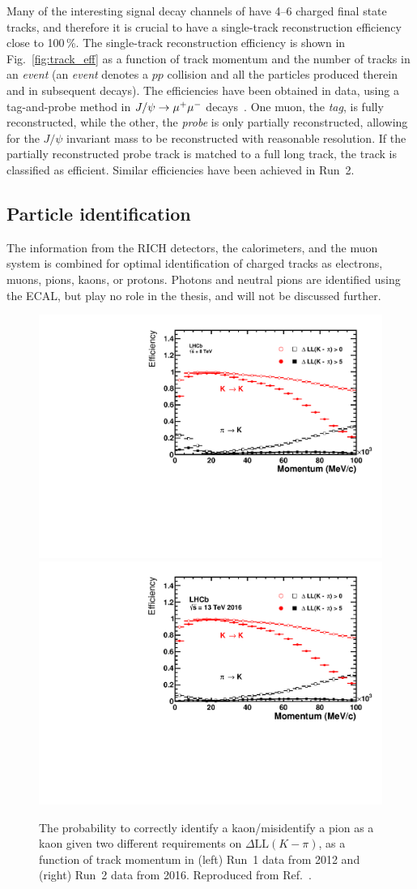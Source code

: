 Many of the interesting signal decay channels of \lhcb have 4--6 charged final state tracks, and therefore it is crucial to have a single-track reconstruction efficiency close to 100\,\%. The single-track reconstruction efficiency is shown in Fig.~\ref{fig:track_eff} as a function of track momentum and the number of tracks in an \emph{event} (an \emph{event} denotes a $pp$ collision and all the particles produced therein and in subsequent decays). The efficiencies have been obtained in data, using a tag-and-probe method in $J/\psi\rightarrow{\ensuremath{\mu^+}}\mu^-$ decays~\cite{TrackEff}. One muon, the \emph{tag}, is fully reconstructed, while the other, the \emph{probe} is only partially reconstructed, allowing for the $J/\psi$ invariant mass to be reconstructed with reasonable resolution. If the partially reconstructed probe track is matched to a full long track, the track is classified as efficient.
Similar efficiencies have been achieved in Run~2.




\subsection{Particle identification} %
\label{sub:particle_identification}
The information from the RICH detectors, the calorimeters, and the muon system is combined for optimal identification of charged tracks as electrons, muons, pions, kaons, or protons. Photons and neutral pions are identified using the ECAL, but play no role in the thesis, and will not be discussed further.

\begin{figure}[tb]
    \centering
    \includegraphics[width=0.45\columnwidth]{figures/detector/PIDK_Run1.pdf}
    \includegraphics[width=0.45\columnwidth]{figures/detector/PIDK_Run2.pdf}
    \caption{The probability to correctly identify a kaon/misidentify a pion as a kaon given two different requirements on $\Delta \mathrm{LL}(K-\pi)$, as a function of track momentum in (left) Run~1 data from 2012 and (right) Run~2 data from 2016. Reproduced from Ref.~\cite{PIDplots}.}
    \label{fig:PID_performance}
\end{figure}

